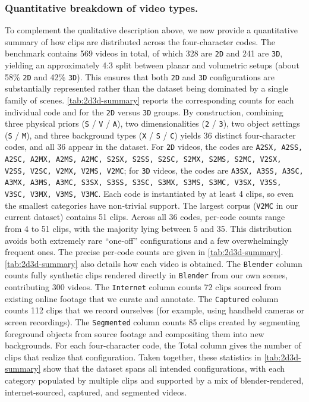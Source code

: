 \subsubsection{Quantitative breakdown of video types.}
To complement the qualitative description above, we now provide a quantitative summary of how clips are distributed across the four-character codes. The benchmark contains 569 videos in total, of which 328 are \texttt{2D} and 241 are \texttt{3D}, yielding an approximately 4:3 split between planar and volumetric setups (about 58\% \texttt{2D} and 42\% \texttt{3D}). This ensures that both \texttt{2D} and \texttt{3D} configurations are substantially represented rather than the dataset being dominated by a single family of scenes. \autoref{tab:2d3d-summary} reports the corresponding counts for each individual code and for the \texttt{2D} versus \texttt{3D} groups.
By construction, combining three physical priors (\texttt{S} / \texttt{V} / \texttt{A}), two dimensionalities (\texttt{2} / \texttt{3}), two object settings (\texttt{S} / \texttt{M}), and three background types (\texttt{X} / \texttt{S} / \texttt{C}) yields 36 distinct four-character codes, and all 36 appear in the dataset. For \texttt{2D} videos, the codes are
\texttt{A2SX, A2SS, A2SC, A2MX, A2MS, A2MC,
S2SX, S2SS, S2SC, S2MX, S2MS, S2MC,
V2SX, V2SS, V2SC, V2MX, V2MS, V2MC};
for \texttt{3D} videos, the codes are
\texttt{A3SX, A3SS, A3SC, A3MX, A3MS, A3MC,
S3SX, S3SS, S3SC, S3MX, S3MS, S3MC,
V3SX, V3SS, V3SC, V3MX, V3MS, V3MC}.
Each code is instantiated by at least 4 clips, so even the smallest categories have non-trivial support. The largest corpus (\texttt{V2MC} in our current dataset) contains 51 clips. Across all 36 codes, per-code counts range from 4 to 51 clips, with the majority lying between 5 and 35. This distribution avoids both extremely rare ``one-off'' configurations and a few overwhelmingly frequent ones. The precise per-code counts are given in \autoref{tab:2d3d-summary}.
\autoref{tab:2d3d-summary} also details how each video is obtained. The \texttt{Blender} column counts fully synthetic clips rendered directly in \texttt{Blender} from our own scenes, contributing 300 videos. The \texttt{Internet} column counts 72 clips sourced from existing online footage that we curate and annotate. The \texttt{Captured} column counts 112 clips that we record ourselves (for example, using handheld cameras or screen recordings). The \texttt{Segmented} column counts 85 clips created by segmenting foreground objects from source footage and compositing them into new backgrounds. For each four-character code, the Total column gives the number of clips that realize that configuration. Taken together, these statistics in \autoref{tab:2d3d-summary} show that the dataset spans all intended configurations, with each category populated by multiple clips and supported by a mix of blender-rendered, internet-sourced, captured, and segmented videos.

